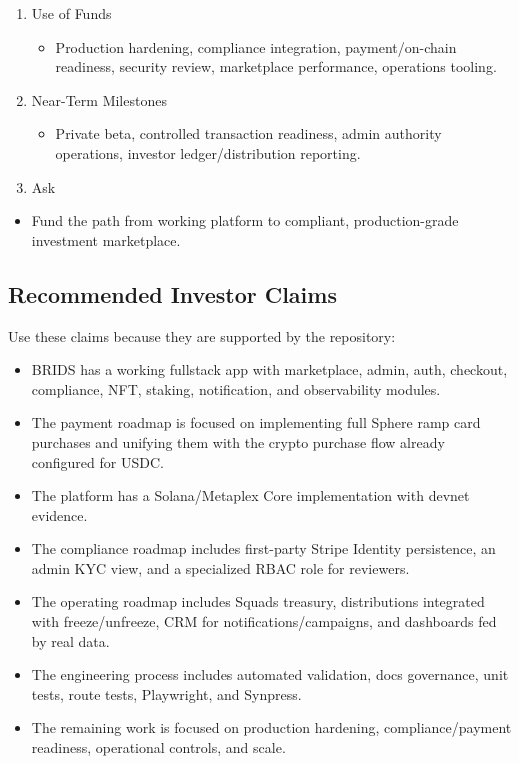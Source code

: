\documentclass[
  10pt,
  letterpaper,
]{article}
\providecommand{\tightlist}{%
  \setlength{\itemsep}{0pt}\setlength{\parskip}{0pt}}
\begin{document}
\begin{enumerate}
  \begin{itemize}
  \tightlist
  \item
    Demo readiness, production foundation, regulated transaction
    readiness, growth and scale.
  \end{itemize}
\item
  Use of Funds

  \begin{itemize}
  \tightlist
  \item
    Production hardening, compliance integration, payment/on-chain
    readiness, security review, marketplace performance, operations
    tooling.
  \end{itemize}
\item
  Near-Term Milestones

  \begin{itemize}
  \tightlist
  \item
    Private beta, controlled transaction readiness, admin authority
    operations, investor ledger/distribution reporting.
  \end{itemize}
\item
  Ask
\end{enumerate}

\begin{itemize}
\tightlist
\item
  Fund the path from working platform to compliant, production-grade
  investment marketplace.
\end{itemize}

\subsection{Recommended Investor
Claims}\label{recommended-investor-claims}

Use these claims because they are supported by the repository:

\begin{itemize}
\tightlist
\item
  BRIDS has a working fullstack app with marketplace, admin, auth,
  checkout, compliance, NFT, staking, notification, and observability
  modules.
\item
  The payment roadmap is focused on implementing full Sphere ramp card
  purchases and unifying them with the crypto purchase flow already
  configured for USDC.
\item
  The platform has a Solana/Metaplex Core implementation with devnet
  evidence.
\item
  The compliance roadmap includes first-party Stripe Identity
  persistence, an admin KYC view, and a specialized RBAC role for
  reviewers.
\item
  The operating roadmap includes Squads treasury, distributions
  integrated with freeze/unfreeze, CRM for notifications/campaigns, and
  dashboards fed by real data.
\item
  The engineering process includes automated validation, docs
  governance, unit tests, route tests, Playwright, and Synpress.
\item
  The remaining work is focused on production hardening,
  compliance/payment readiness, operational controls, and scale.
\end{itemize}
\end{document}
